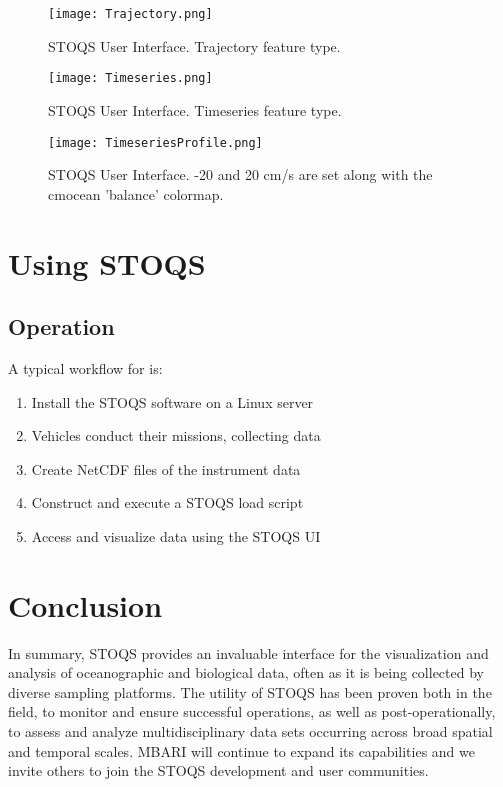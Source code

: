 \documentclass[conference]{IEEEtran}
\begin{document}
\begin{figure*}[htbp]
\centering
\texttt{[image: Trajectory.png]}
\caption{STOQS User Interface. Trajectory feature type.}
\label{fig:Trajectory}
\end{figure*}

\begin{figure*}[htbp]
\centering
\texttt{[image: Timeseries.png]}
\caption{STOQS User Interface. Timeseries feature type.}
\label{fig:Timeseries}
\end{figure*}

\begin{figure*}[htbp]
\centering
\texttt{[image: TimeseriesProfile.png]}
\caption{STOQS User Interface. -20 and 20 cm/s are set along with the cmocean 'balance' colormap.}
\label{fig:Timeseries}
\end{figure*}

\section{Using STOQS}

\subsection{Operation}


A typical workflow for is:
\begin{enumerate}
\item Install the STOQS software on a Linux server
\item Vehicles conduct their missions, collecting data
\item Create NetCDF files of the instrument data
\item Construct and execute a STOQS load script
\item Access and visualize data using the STOQS UI
\end{enumerate}




\section{Conclusion}
In summary, STOQS provides an invaluable interface for the visualization and analysis of oceanographic and biological data, often as it is being collected by diverse sampling platforms.  The utility of STOQS has been proven both in the field, to monitor and ensure successful operations, as well as post-operationally, to assess and analyze multidisciplinary data sets occurring across broad spatial and temporal scales. MBARI will continue to expand its capabilities and we invite others to join the STOQS development and user communities.
\end{document}
